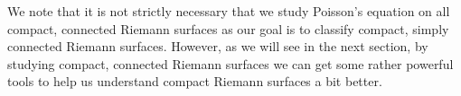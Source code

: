 \documentclass[11pt]{report}
\theoremstyle{definition}
\begin{document}
We note that it is not strictly necessary that we study Poisson's equation on all compact, connected Riemann surfaces as our goal is to classify compact, simply connected Riemann surfaces. However, as we will see in the next section, by studying compact, connected Riemann surfaces we can get some rather powerful tools to help us understand compact Riemann surfaces a bit better.

\end{document}
